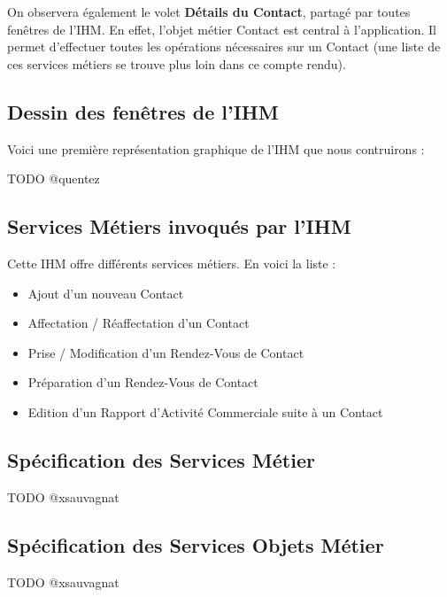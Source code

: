 On observera également le volet \textbf{Détails du Contact}, partagé par toutes fenêtres de l'IHM.
En effet, l'objet métier Contact est central à l'application. Il permet d'effectuer toutes les
opérations nécessaires sur un Contact (une liste de ces services métiers se trouve plus loin
dans ce compte rendu).

\subsection{Dessin des fenêtres de l'IHM}

Voici une première représentation graphique de l'IHM que nous contruirons :

TODO @quentez

\subsection{Services Métiers invoqués par l'IHM}

Cette IHM offre différents services métiers. En voici la liste :

\begin{itemize}
\item Ajout d'un nouveau Contact
\item Affectation / Réaffectation d'un Contact
\item Prise / Modification d'un Rendez-Vous de Contact
\item Préparation d'un Rendez-Vous de Contact
\item Edition d'un Rapport d'Activité Commerciale suite à un Contact 
\end{itemize}

\subsection{Spécification des Services Métier}

TODO @xsauvagnat

\subsection{Spécification des Services Objets Métier}

TODO @xsauvagnat